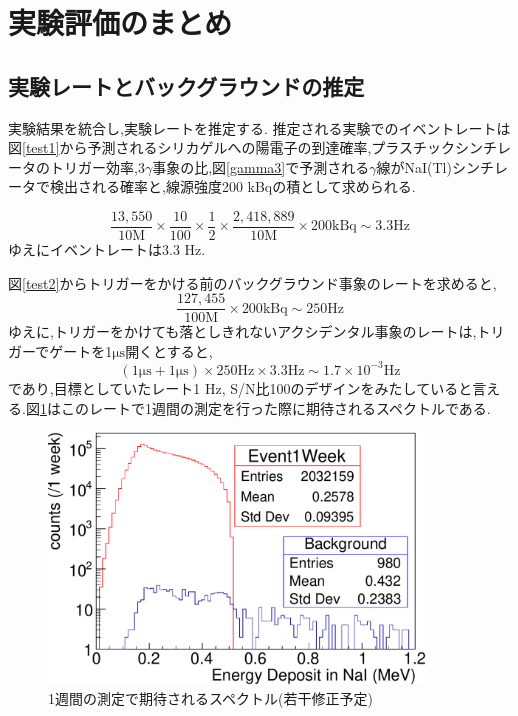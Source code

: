 \section{実験評価のまとめ}
\label{section_testall}

\subsection{実験レートとバックグラウンドの推定}
実験結果を統合し,実験レートを推定する.
推定される実験でのイベントレートは図\ref{test1}から予測されるシリカゲルへの陽電子の到達確率,プラスチックシンチレータのトリガー効率,$3\gamma$事象の比,図\ref{gamma3}で予測される$\gamma$線がNaI(Tl)シンチレータで検出される確率と,線源強度200 kBqの積として求められる.

\begin{equation}
	\nonumber
	\frac{13,550}{10 \mathrm{M}} \times \frac{10}{100} \times \frac{1}{2} \times \frac{2,418,889}{10 \mathrm{M}} \times 200 \mathrm{kBq} \sim 3.3 \mathrm{Hz}
\end{equation}
ゆえにイベントレートは3.3 Hz.

図\ref{test2}からトリガーをかける前のバックグラウンド事象のレートを求めると,
\begin{equation}
	\nonumber
	\frac{127,455}{100\mathrm{M}} \times 200 \mathrm{kBq} \sim 250 \mathrm{ Hz}
\end{equation}
ゆえに,トリガーをかけても落としきれないアクシデンタル事象のレートは,トリガーでゲートを1$\si{\micro \second}$開くとすると,
\begin{equation}
	\nonumber
	( 1 \si{\micro \second} + 1 \si{\micro \second}) \times  250 \mathrm{Hz} \times 3.3 \mathrm{Hz} \sim 1.7 \times 10^{-3} \mathrm{Hz}
\end{equation}
であり,目標としていたレート1 Hz, S/N比100のデザインをみたしていると言える.図\ref{test_all}はこのレートで1週間の測定を行った際に期待されるスペクトルである.

\begin{figure}[htbp]
	\centering
		\includegraphics[width=10cm]{fig/test_all.pdf}
	\caption{1週間の測定で期待されるスペクトル(若干修正予定)}
	\label{test_all}
\end{figure}

